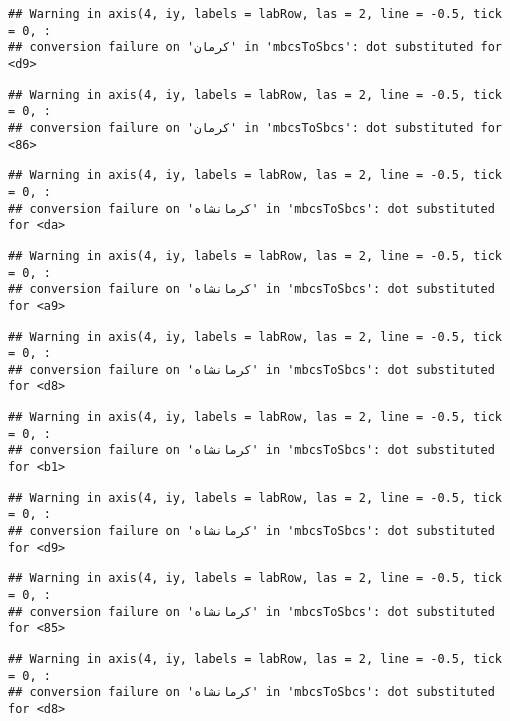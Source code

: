 \documentclass[
]{article}
\begin{document}
\begin{verbatim}
## Warning in axis(4, iy, labels = labRow, las = 2, line = -0.5, tick = 0, :
## conversion failure on 'کرمان' in 'mbcsToSbcs': dot substituted for <d9>
\end{verbatim}

\begin{verbatim}
## Warning in axis(4, iy, labels = labRow, las = 2, line = -0.5, tick = 0, :
## conversion failure on 'کرمان' in 'mbcsToSbcs': dot substituted for <86>
\end{verbatim}

\begin{verbatim}
## Warning in axis(4, iy, labels = labRow, las = 2, line = -0.5, tick = 0, :
## conversion failure on 'کرمانشاه' in 'mbcsToSbcs': dot substituted for <da>
\end{verbatim}

\begin{verbatim}
## Warning in axis(4, iy, labels = labRow, las = 2, line = -0.5, tick = 0, :
## conversion failure on 'کرمانشاه' in 'mbcsToSbcs': dot substituted for <a9>
\end{verbatim}

\begin{verbatim}
## Warning in axis(4, iy, labels = labRow, las = 2, line = -0.5, tick = 0, :
## conversion failure on 'کرمانشاه' in 'mbcsToSbcs': dot substituted for <d8>
\end{verbatim}

\begin{verbatim}
## Warning in axis(4, iy, labels = labRow, las = 2, line = -0.5, tick = 0, :
## conversion failure on 'کرمانشاه' in 'mbcsToSbcs': dot substituted for <b1>
\end{verbatim}

\begin{verbatim}
## Warning in axis(4, iy, labels = labRow, las = 2, line = -0.5, tick = 0, :
## conversion failure on 'کرمانشاه' in 'mbcsToSbcs': dot substituted for <d9>
\end{verbatim}

\begin{verbatim}
## Warning in axis(4, iy, labels = labRow, las = 2, line = -0.5, tick = 0, :
## conversion failure on 'کرمانشاه' in 'mbcsToSbcs': dot substituted for <85>
\end{verbatim}

\begin{verbatim}
## Warning in axis(4, iy, labels = labRow, las = 2, line = -0.5, tick = 0, :
## conversion failure on 'کرمانشاه' in 'mbcsToSbcs': dot substituted for <d8>
\end{verbatim}
\end{document}

